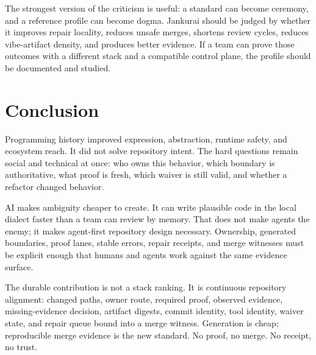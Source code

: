 The strongest version of the criticism is useful: a standard can become ceremony, and a reference profile can become dogma. Jankurai should be judged by whether it improves repair locality, reduces unsafe merges, shortens review cycles, reduces vibe-artifact density, and produces better evidence. If a team can prove those outcomes with a different stack and a compatible control plane, the profile should be documented and studied.

\section{Conclusion}

Programming history improved expression, abstraction, runtime safety, and ecosystem reach. It did not solve repository intent. The hard questions remain social and technical at once: who owns this behavior, which boundary is authoritative, what proof is fresh, which waiver is still valid, and whether a refactor changed behavior.

AI makes ambiguity cheaper to create. It can write plausible code in the local dialect faster than a team can review by memory. That does not make agents the enemy; it makes agent-first repository design necessary. Ownership, generated boundaries, proof lanes, stable errors, repair receipts, and merge witnesses must be explicit enough that humans and agents work against the same evidence surface.

The durable contribution is not a stack ranking. It is continuous repository alignment: changed paths, owner route, required proof, observed evidence, missing-evidence decision, artifact digests, commit identity, tool identity, waiver state, and repair queue bound into a merge witness. Generation is cheap; reproducible merge evidence is the new standard. No proof, no merge. No receipt, no trust.
